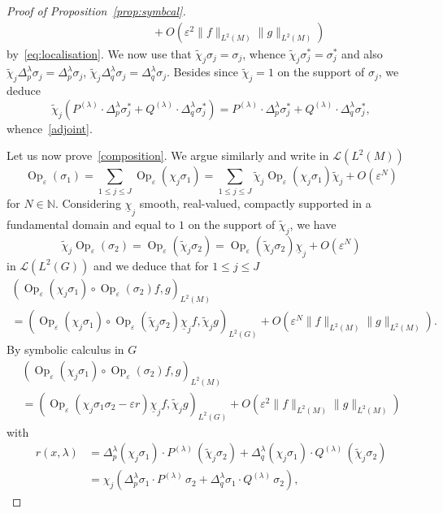 \documentclass[10pt]{amsart}
\let\mathcal\mathscr
\DeclareMathOperator{\Op}{Op}
\theoremstyle{plain}
\theoremstyle{definition}
\let\eps\varepsilon
\def\N{{\mathbb N}}
\begin{document}
\begin{proof}[Proof of Proposition~\ref{prop:symbcal}]
\begin{align*}
&\qquad \qquad+O(\eps^2 \| f\|_{L^2(M)} \| g\|_{L^2(M)})
\end{align*}
by~\eqref{eq:localisation}.
We now use that $\widetilde \chi_j \sigma_j=\sigma_j$, whence $\widetilde \chi_j \sigma_j^*=\sigma_j^*$ and also
$\widetilde \chi_j \Delta_p^\lambda \sigma_j = \Delta_p^\lambda \sigma_j$, $\widetilde \chi_j \Delta_q^\lambda \sigma_j = \Delta_q^\lambda \sigma_j
$. Besides since $\widetilde \chi_j=1$ on the support of $\sigma_j$, we deduce
\[
\widetilde \chi_j (P^{(\lambda)}\cdot \Delta^\lambda_p \sigma_j^*+Q^{(\lambda)}\cdot \Delta^\lambda_q \sigma_j^*)
=P^{(\lambda)}\cdot \Delta^\lambda_p \sigma_j^*+Q^{(\lambda)}\cdot \Delta^\lambda_q \sigma_j^*,
\]
whence~\eqref{adjoint}.

Let us now prove~\eqref{composition}. We argue similarly and write in $\mathcal L (L^2(M))$
\[
\Op_\eps(\sigma_1) = \sum_{1\leq j\leq J} \Op_\eps(\chi_j\sigma_1) = \sum_{1\leq j\leq J} \widetilde \chi_j\Op_\eps(\chi_j\sigma_1)\widetilde \chi_j +O(\eps^N)
\]
for $N\in\N$. Considering $\underline \chi_j$ smooth, real-valued, compactly supported in a fundamental domain and equal to $1$ on the support of $\widetilde \chi_j$,
we have
\[
\widetilde \chi_j \Op_\eps (\sigma_2)= \Op_\eps (\widetilde \chi_j\sigma_2)= \Op_\eps (\widetilde \chi_j\sigma_2)\underline\chi_j +O(\eps^N)
\]
in $\mathcal L (L^2(G))$ and
we deduce that for $1\leq j\leq J$
\begin{multline*}
\left(\Op_\eps (\chi_j\sigma_1)\circ \Op_\eps (\sigma_2) f,g\right)_{L^2(M)}\\
= \left(\Op_\eps (\chi_j\sigma_1)\circ \Op_\eps (\widetilde \chi_j\sigma_2) \underline \chi_jf, \widetilde \chi_jg\right)_{L^2(G)}
+O(\eps^N\| f\|_{L^2(M)}\| g\|_{L^2(M)}).
\end{multline*}
By symbolic calculus in $G$
\begin{multline*}
\left(\Op_\eps (\chi_j\sigma_1)\circ \Op_\eps (\sigma_2) f,g\right)_{L^2(M)}\\
= \left(\Op_\eps (\chi_j \sigma_1 \sigma_2 -\eps r) \underline \chi_jf, \widetilde \chi_j g\right)_{L^2(G)} +O(\eps^2\| f\|_{L^2(M)}\| g\|_{L^2(M)})
\end{multline*}
with
\begin{align*}
r(x,\lambda)&= \Delta_p^\lambda (\chi_j \sigma_1) \cdot P^{(\lambda)}\,(\widetilde \chi_j\sigma_2)+\Delta^\lambda_q (\chi_j\sigma_1) \cdot Q^{(\lambda)}\, (\widetilde \chi_j \sigma_2)\\
&=
\chi_j(\Delta_p^\lambda \sigma_1 \cdot P^{(\lambda)}\,\sigma_2+\Delta^\lambda_q \sigma_1 \cdot Q^{(\lambda)}\, \sigma_2),

\end{align*}
\end{proof}
\end{document}
